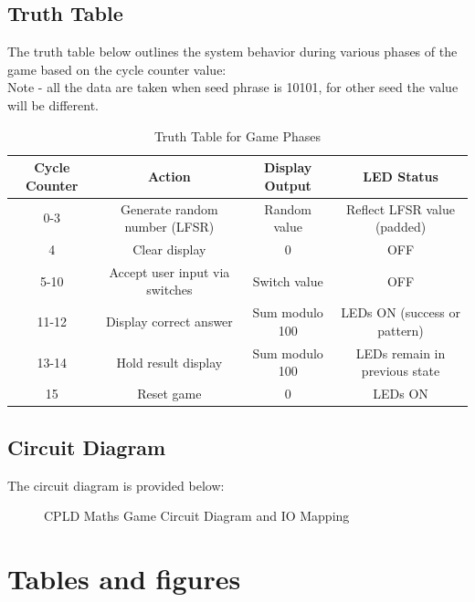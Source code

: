 \documentclass[10pt,a4paper,twocolumn,twoside]{tau-class/tau}
\begin{document}
    \subsection{Truth Table}
    
    The truth table below outlines the system behavior during various phases of the game based on the cycle counter value:
    \vspace{15pt}
    \\
    Note - all the data are taken when seed phrase is 10101, for other seed the value will be different.

    \begin{table}[tp]
        \centering
        \begin{tabular}{|c|c|c|c|}
            \hline
            \textbf{Cycle Counter} & \textbf{Action} & \textbf{Display Output} & \textbf{LED Status} \\
            \hline
            0-3 & Generate random number (LFSR) & Random value & Reflect LFSR value (padded) \\
            4 & Clear display & 0 & OFF \\
            5-10 & Accept user input via switches & Switch value & OFF \\
            11-12 & Display correct answer & Sum modulo 100 & LEDs ON (success or pattern) \\
            13-14 & Hold result display & Sum modulo 100 & LEDs remain in previous state \\
            15 & Reset game & 0 & LEDs ON \\
            \hline
        \end{tabular}
        \caption{Truth Table for Game Phases}
        \label{tab:truthtable}
    \end{table}
	
    \subsection{Circuit Diagram}
    
    The circuit diagram is provided below:
    
    \begin{figure}[h!]
        \centering
        \caption{CPLD Maths Game Circuit Diagram and IO Mapping}
        \label{fig:circuitdiagram}
    \end{figure}

\section{Tables and figures}
\end{document}
